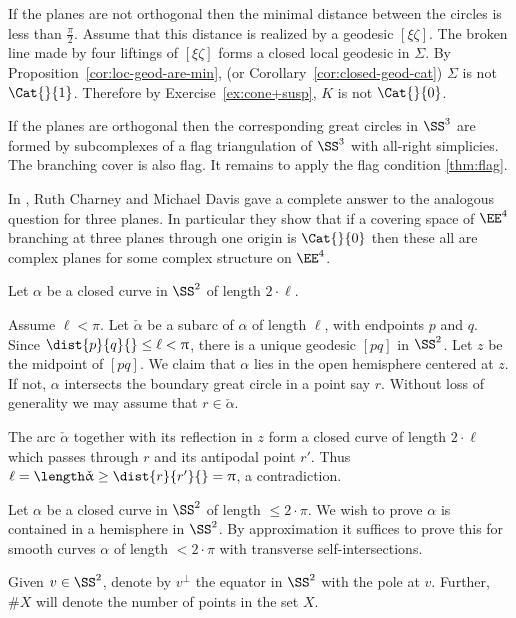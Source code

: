 If the planes are not orthogonal then the minimal distance between the circles is less than $\tfrac\pi2$.
Assume that this distance is realized by a geodesic $[\xi\zeta]$.
The broken line made by four liftings of $[\xi\zeta]$ forms a closed 
local
geodesic in $\Sigma$. 
By Proposition~\ref{cor:loc-geod-are-min},
(or Corollary~\ref{cor:closed-geod-cat}) 
$\Sigma$ is not $\Cat{}{1}$.
Therefore by Exercise~\ref{ex:cone+susp}, $K$ is not $\Cat{}{0}$.

If the planes are orthogonal then the corresponding great circles in $\SS^3$ are formed by subcomplexes of a flag triangulation of $\SS^3$ with all-right simplicies.
The branching cover is also flag.
It remains to apply the flag condition \ref{thm:flag}.

In \cite{charney-davis-93}, Ruth Charney and Michael Davis
gave a complete answer to the analogous question for three planes.
In particular they show that if a covering space of $\EE^4$
branching at three planes through one origin is $\Cat{}{0}$ then these all are complex planes for some complex structure on $\EE^4$.
\qeds

Let $\alpha$ be a closed curve in $\SS^2$ of length $2\cdot\ell$.

Assume $\ell<\pi$.
Let $\check\alpha$ be a subarc of $\alpha$ of length $\ell$, with endpoints $p$ and $q$. 
Since $\dist{p}{q}{}\le\ell<\pi$, there is a unique geodesic $[pq]$ in $\SS^2$.  
Let $z$ be the midpoint of  $[pq]$.  
We claim that $\alpha$ lies in the open hemisphere centered at $z$.  
If not, $\alpha$ intersects the boundary  great circle in a point say $r$.
Without loss of generality we may assume that $r\in\check\alpha$.

The arc $\check\alpha$ together with its reflection in $z$ form a closed curve of length $2\cdot \ell$ which passes through $r$ and its antipodal point $r'$.
Thus $\ell=\length \check\alpha\ge \dist{r}{r'}{}=\pi$, a contradiction.
\qeds

Let $\alpha$ be a closed curve in  $\SS^2$ of length $\le 2\cdot\pi$.  We wish to prove $\alpha$ is contained in a hemisphere in $\SS^2$.
By approximation it suffices to prove this for  smooth curves $\alpha$ of length $< 2\cdot\pi$ with transverse self-intersections. 

Given $v\in \SS^2$, denote by $v^\perp$ the equator in $\SS^2$ with the pole at $v$.
Further, $\# X$ will denote the number of points in the set $X$.

